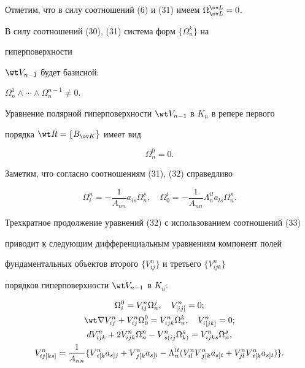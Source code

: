  


Отметим, что в силу соотношений (6) и (31) имеем $\Omega^{\ov L}_{\ov L}=0$. 


В силу соотношений (30), (31) система форм $\{\Omega^k_n\}$ на 


гиперповерхности 


$\wt V_{n-1}$ будет базисной: 


$\Omega^1_n\wedge\dotsb\wedge\Omega^{n-1}_n\ne0$. 


Уравнение полярной гиперповерхности $\wt V_{n-1}$ в $K_n$ в репере первого 


порядка $\wt R=\{B_{\ov K}\}$ имеет вид 


\begin{equation} 


\Omega^0_n=0. 


\end{equation} 


Заметим, что согласно соотношениям (31), (32) справедливо 


\begin{equation} 


\Omega^n_i=-\frac{1}{A_{nn}}a_{is}\Omega^s_n,\quad 


\Omega^i_0=-\frac{1}{A_{nn}}\Lambda^{il}_n a_{ls}\Omega^s_n. 


\end{equation} 


 


Трехкратное продолжение уравнений (32) с использованием соотношений (33) 


приводит к следующим дифференциальным уравнениям компонент полей 


фундаментальных объектов второго $\{V^n_{ij}\}$ и третьего $\{V^n_{ijk}\}$ 


порядков гиперповерхности $\wt V_{n-1}$ в $K_n$: 


\begin{gather} 


\Omega^0_i=V^n_{ij}\Omega^j_n,\quad V^n_{[ij]}=0;\notag\\ 


%


\wt\nabla V^n_{ij}+V^n_{ij}\Omega^0_0=V^n_{ijk}\Omega^k_n, 


\quad V^n_{i[jk]}=0;\\ 


%


dV^n_{ijk}+2V^n_{ijk}\Omega^n_n-V{}^n_{s(ij}\Omega{}_{k)}^s= 


V^n_{ijks}\Omega^s_n,\notag\\ 


%


V^n_{ij[ks]}=\frac{1}{A_{nn}}\{V{}_{i[k}^n a{}_{s]j}+ 


V{}^n_{j[k}a{}_{s]i}-\Lambda^{lt}_n(V^n_{il}V{}^n_{j[k} 


a{}_{s]t}+V^n_{jl}V{}^n_{i[k}a{}_{s]t})\}\notag. 


\end{gather} 


